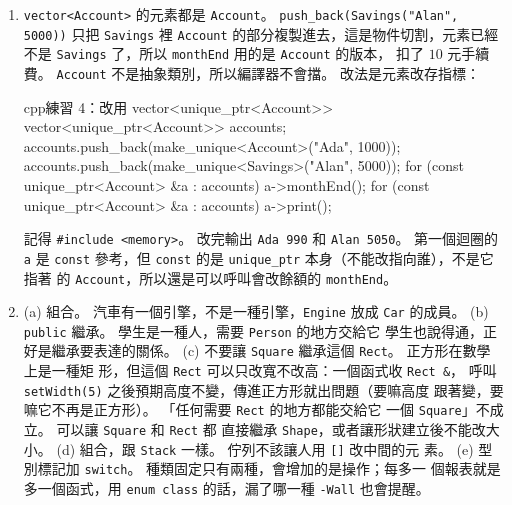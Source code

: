 \begin{enumerate}
\item \texttt{vector<Account>} 的元素都是 \texttt{Account}。
\texttt{push\_back(Savings("Alan", 5000))} 只把 \texttt{Savings} 裡
\texttt{Account} 的部分複製進去，這是物件切割，元素已經不是
\texttt{Savings} 了，所以 \texttt{monthEnd} 用的是 \texttt{Account} 的版本，
扣了 $10$ 元手續費。 \texttt{Account} 不是抽象類別，所以編譯器不會擋。
改法是元素改存指標：
\begin{code}{cpp}{練習 4：改用 vector<unique\_ptr<Account>>}
vector<unique_ptr<Account>> accounts;
accounts.push_back(make_unique<Account>("Ada", 1000));
accounts.push_back(make_unique<Savings>("Alan", 5000));
for (const unique_ptr<Account> &a : accounts) {
    a->monthEnd();
}
for (const unique_ptr<Account> &a : accounts) {
    a->print();
}
\end{code}
記得 \texttt{\#include <memory>}。 改完輸出 \texttt{Ada 990} 和
\texttt{Alan 5050}。 第一個迴圈的 \texttt{a} 是 \texttt{const} 參考，但
\texttt{const} 的是 \texttt{unique\_ptr} 本身（不能改指向誰），不是它指著
的 \texttt{Account}，所以還是可以呼叫會改餘額的 \texttt{monthEnd}。
\item
(a) 組合。 汽車有一個引擎，不是一種引擎，\texttt{Engine} 放成
\texttt{Car} 的成員。
(b) \texttt{public} 繼承。 學生是一種人，需要 \texttt{Person} 的地方交給它
學生也說得通，正好是繼承要表達的關係。
(c) 不要讓 \texttt{Square} 繼承這個 \texttt{Rect}。 正方形在數學上是一種矩
形，但這個 \texttt{Rect} 可以只改寬不改高：一個函式收 \texttt{Rect \&}，
呼叫 \texttt{setWidth(5)} 之後預期高度不變，傳進正方形就出問題（要嘛高度
跟著變，要嘛它不再是正方形）。 「任何需要 \texttt{Rect} 的地方都能交給它
一個 \texttt{Square}」不成立。 可以讓 \texttt{Square} 和 \texttt{Rect} 都
直接繼承 \texttt{Shape}，或者讓形狀建立後不能改大小。
(d) 組合，跟 \texttt{Stack} 一樣。 佇列不該讓人用 \texttt{[]} 改中間的元
素。
(e) 型別標記加 \texttt{switch}。 種類固定只有兩種，會增加的是操作；每多一
個報表就是多一個函式，用 \texttt{enum class} 的話，漏了哪一種
\texttt{-Wall} 也會提醒。
\end{enumerate}
